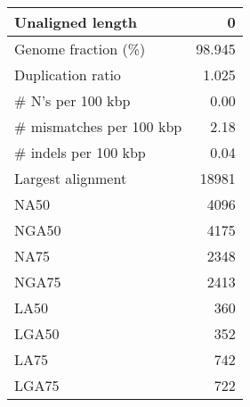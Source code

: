 \documentclass[12pt,a4paper]{article}
\begin{document}
\begin{table}[ht]
\begin{center}
\begin{tabular}{|l*{1}{|r}|}
Unaligned length & 0 \\ \hline
Genome fraction (\%) & 98.945 \\ \hline
Duplication ratio & 1.025 \\ \hline
\# N's per 100 kbp & 0.00 \\ \hline
\# mismatches per 100 kbp & 2.18 \\ \hline
\# indels per 100 kbp & 0.04 \\ \hline
Largest alignment & 18981 \\ \hline
NA50 & 4096 \\ \hline
NGA50 & 4175 \\ \hline
NA75 & 2348 \\ \hline
NGA75 & 2413 \\ \hline
LA50 & 360 \\ \hline
LGA50 & 352 \\ \hline
LA75 & 742 \\ \hline
LGA75 & 722 \\ \hline
\end{tabular}
\end{center}
\end{table}
\end{document}
